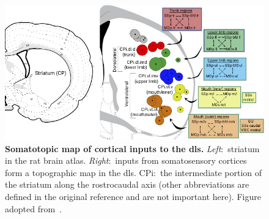 \begin{figure}[bth!]
	\begin{center}
		\includegraphics[width=1\linewidth]{ch-intro/figures/StriatumInputMap}
		\caption[Map of Cortical Inputs to DLS]
		{\textbf{Somatotopic map of cortical inputs to the \gls{dls}.}
		\textit{Left}:~striatum in the rat brain atlas.
		\textit{Right}:~inputs from somatosensory cortices form a topographic map in the \gls{dls}.
		CPi:~the intermediate portion of the striatum along the rostrocaudal axis (other abbreviations are defined in the original reference and are not important here).
		Figure adopted from~\cite{Hintiryan2016NN}.
		}
		\label{fig:intro:InputMap}
	\end{center}
\end{figure}